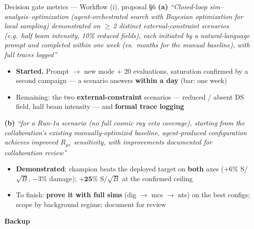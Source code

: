 \documentclass[aspectratio=169,10pt]{beamer}
\begin{document}
\begin{frame}{Decision gate metrics --- Workflow (i), proposal \S6}
\footnotesize
\textbf{(a)} \emph{``Closed-loop sim--analysis--optimization (agent-orchestrated search with Bayesian
optimization for local sampling) demonstrated on $\ge$\,2 distinct external-constraint scenarios
(e.g.\ half beam intensity, 10\% reduced fields), each initiated by a natural-language prompt and
completed within one week (vs.\ months for the manual baseline), with full traces logged''}
\begin{itemize}\footnotesize
  \item[$\rightarrow$] \textbf{Started.} Prompt $\rightarrow$ new mode $+$ 20 evaluations, saturation confirmed by a second campaign --- a scenario answers \textbf{within a day} (bar: one week)
  \item[$\rightarrow$] Remaining: the two \textbf{external-constraint} scenarios --- reduced / absent DS field, half beam intensity --- and \textbf{formal trace logging}
\end{itemize}
\vspace{0.7em}

\textbf{(b)} \emph{``for a Run-1a scenario (no full cosmic ray veto coverage), starting from the
collaboration's existing manually-optimized baseline, agent-produced configuration achieves improved
$R_{\mu e}$ sensitivity, with improvements documented for collaboration review''}
\begin{itemize}\footnotesize
  \item[$\rightarrow$] \textcolor{okgreen}{\textbf{Demonstrated}}: champion beats the deployed target on \textbf{both} axes ($+6\%$ S/$\sqrt{B}$, $-3\%$ damage); $\mathbf{+25\%}$ S/$\sqrt{B}$ at the confirmed ceiling
  \item[$\rightarrow$] To finish: \textbf{prove it with full sims} (dig $\rightarrow$ mcs $\rightarrow$ nts) on the best configs; scope by background regime; document for review
\end{itemize}
\end{frame}


\begin{frame}[plain]
\vspace{2.5em}
\begin{center}
{\Large\bfseries\color{fnalblue} Backup}
\end{center}
\end{frame}
\end{document}
